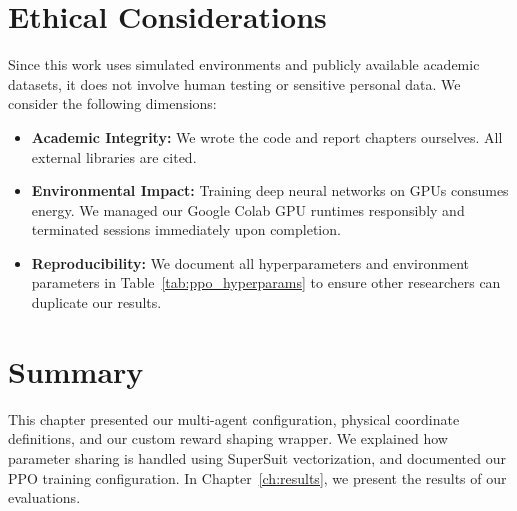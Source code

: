 \section{Ethical Considerations}
\label{sec:ethics}

Since this work uses simulated environments and publicly available academic datasets, it does not involve human testing or sensitive personal data. We consider the following dimensions:
\begin{itemize}
    \item \textbf{Academic Integrity:} We wrote the code and report chapters ourselves. All external libraries are cited.
    \item \textbf{Environmental Impact:} Training deep neural networks on GPUs consumes energy. We managed our Google Colab GPU runtimes responsibly and terminated sessions immediately upon completion.
    \item \textbf{Reproducibility:} We document all hyperparameters and environment parameters in Table~\ref{tab:ppo_hyperparams} to ensure other researchers can duplicate our results.
\end{itemize}

\section{Summary}
\label{sec:method_summary}

This chapter presented our multi-agent configuration, physical coordinate definitions, and our custom reward shaping wrapper. We explained how parameter sharing is handled using SuperSuit vectorization, and documented our PPO training configuration. In Chapter~\ref{ch:results}, we present the results of our evaluations.